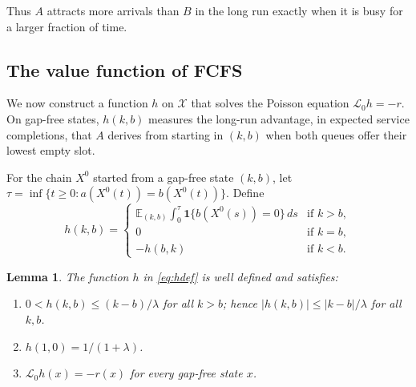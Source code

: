 \documentclass[11pt]{article}
\newtheorem{blem}[bthm]{Lemma}
\theoremstyle{definition}
\theoremstyle{remark}
\newcommand{\E}{\mathbb{E}}
\newcommand{\ind}{\mathbf{1}}
\newcommand{\cX}{\mathcal{X}}
\newcommand{\cL}{\mathcal{L}}
\begin{document}
Thus $A$ attracts more arrivals than $B$ in the long run exactly when it is
busy for a larger fraction of time.

\subsection{The value function of FCFS}

We now construct a function $h$ on $\cX$ that solves the Poisson equation
$\cL_0h=-r$. On gap-free states, $h(k,b)$ measures the long-run advantage, in
expected service completions, that $A$ derives from starting in $(k,b)$ when
both queues offer their lowest empty slot.

For the chain $X^0$ started from a gap-free state $(k,b)$, let
$\tau=\inf\{t\ge0:a(X^0(t))=b(X^0(t))\}$. Define
\begin{equation}\label{eq:hdef}
  h(k,b)=
  \begin{cases}
    \E_{(k,b)}\displaystyle\int_0^{\tau}\ind\{b(X^0(s))=0\}\,ds & \text{if }k>b,\\[1ex]
    0 & \text{if }k=b,\\[0.5ex]
    -h(b,k) & \text{if }k<b.
  \end{cases}
\end{equation}

\begin{blem}\label{lem:h}
The function $h$ in \eqref{eq:hdef} is well defined and satisfies:
\begin{enumerate}
\item[(a)] $0<h(k,b)\le (k-b)/\lambda$ for all $k>b$; hence
  $|h(k,b)|\le |k-b|/\lambda$ for all $k,b$.
\item[(b)] $h(1,0)=1/(1+\lambda)$.
\item[(c)] $\cL_0h(x)=-r(x)$ for every gap-free state $x$.
\end{enumerate}
\end{blem}
\end{document}
